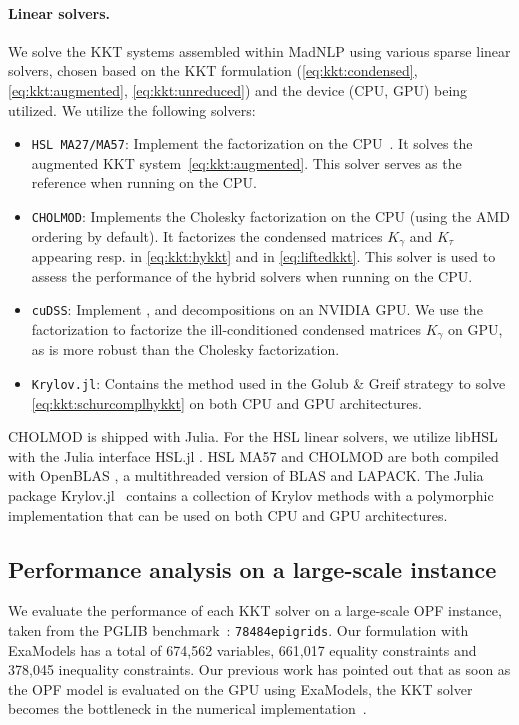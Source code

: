 \paragraph{Linear solvers.}
We solve the KKT systems assembled within MadNLP using various sparse linear solvers, chosen based on the KKT formulation (\ref{eq:kkt:condensed}, \ref{eq:kkt:augmented}, \ref{eq:kkt:unreduced}) and the device (CPU, GPU) being utilized. We utilize the following solvers:
\begin{itemize}
  \item {\tt HSL MA27/MA57}: Implement the \lblt factorization on the CPU~\cite{duff1983multifrontal}.
    It solves the augmented KKT system~\eqref{eq:kkt:augmented}.
    This solver serves as the reference when running on the CPU.
  \item {\tt CHOLMOD}: Implements the Cholesky factorization on the CPU %
    (using the AMD ordering \cite{amestoy-david-duff-2004} by default).
    It factorizes the condensed matrices $K_\gamma$ and $K_\tau$ appearing
    resp. in \eqref{eq:kkt:hykkt} and in \eqref{eq:liftedkkt}.
    This solver is used to assess the performance of the hybrid solvers when running on the CPU.
  \item {\tt cuDSS}: Implement \llt, \ldlt and \lu decompositions on an NVIDIA GPU.
    We use the \ldlt factorization to factorize the ill-conditioned condensed matrices $K_\gamma$ on GPU,
    as \ldlt is more robust than the Cholesky factorization.
  \item {\tt Krylov.jl}: Contains the \CG method
    used in the Golub \& Greif strategy to solve \eqref{eq:kkt:schurcomplhykkt} on both CPU and GPU architectures.
\end{itemize}
CHOLMOD \cite{chen-davis-hager-rajamanickam-2008} is shipped with Julia.
For the HSL linear solvers, we utilize libHSL \cite{fowkes-lister-montoison-orban-2024} with the Julia interface HSL.jl \cite{montoison-orban-hsl-2021}.
HSL MA57 and CHOLMOD are both compiled with OpenBLAS \cite{openblas}, a multithreaded version of BLAS and LAPACK.
The Julia package Krylov.jl~\cite{montoison2023krylov} contains a collection of Krylov methods with a polymorphic implementation that can be used on both CPU and GPU architectures.

\subsection{Performance analysis on a large-scale instance}
\label{sec:num:pprof}
We evaluate the performance of each KKT solver on a large-scale OPF instance, taken from
the PGLIB benchmark~\cite{babaeinejadsarookolaee2019power}: {\tt 78484epigrids}.
Our formulation with ExaModels has
a total of 674,562 variables, 661,017 equality constraints and 378,045
inequality constraints.
Our previous work has pointed out that as soon as the OPF model is
evaluated on the GPU using ExaModels, the KKT solver becomes the bottleneck
in the numerical implementation~\cite{shin2023accelerating}.

